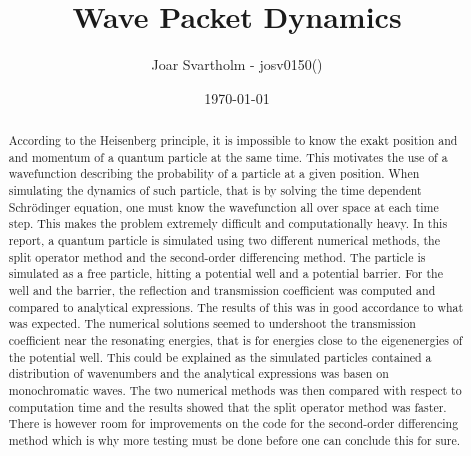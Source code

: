 

  \title{Wave Packet Dynamics}

  \author{
    Joar Svartholm - josv0150()\\
  }
  \date{\today}

\begin{titlepage}
  \maketitle
  \thispagestyle{fancy}
  \headheight 35pt
  \rhead{\small\today}

\begin{abstract}
  \noindent According to the Heisenberg principle, it is impossible to know the exakt position and and momentum of a quantum particle at the same time. This motivates the use of a wavefunction describing the probability of a particle at a given position. When simulating the dynamics of such particle, that is by solving the time dependent Schrödinger equation, one must know the wavefunction all over space at each time step. This makes the problem extremely difficult and computationally heavy. In this report, a quantum particle is simulated using two different numerical methods, the split operator method and the second-order differencing method. The particle is simulated as a free particle, hitting a potential well and a potential barrier. For the well and the barrier, the reflection and transmission coefficient was computed and compared to analytical expressions. The results of this was in good accordance to what was expected. The numerical solutions seemed to undershoot the transmission coefficient near the resonating energies, that is for energies close to the eigenenergies of the potential well. This could be explained as the simulated particles contained a distribution of wavenumbers and the analytical expressions was basen on monochromatic waves.
  The two numerical methods was then compared with respect to computation time and the results showed that the split operator method was faster. There is however room for improvements on the code for the second-order differencing method which is why more testing must be done before one can conclude this for sure.

\end{abstract}


\end{titlepage}


